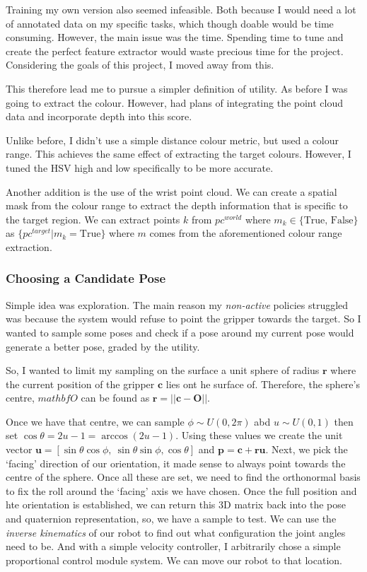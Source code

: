 Training my own version also seemed infeasible. Both because I would need a lot of annotated data on my specific tasks, which though doable would be time consuming. However, the main issue was the time. Spending time to tune and create the perfect feature extractor would waste precious time for the project. Considering the goals of this project, I moved away from this.

This therefore lead me to pursue a simpler definition of utility. As before  I was going to extract the colour. However, had plans of integrating the point cloud data and incorporate depth into this score.

Unlike before, I didn't use a simple distance colour metric, but used a colour range. This achieves the same effect of extracting the target colours. However, I tuned the HSV high and low specifically to be more accurate. 

Another addition is the use of the wrist point cloud. We can create a spatial mask from the colour range to extract the depth information that is specific to the target region. We can extract points $k$ from \( {pc}^{world}\) where \(m_k \in \{ \text{True, False} \}\) as \( \{ {pc}^{target} | m_k = \text{True} \} \) where $m$ comes from the aforementioned colour range extraction.

\subsubsection{Choosing a Candidate Pose}\label{sec:appl-first-choose-pose}
Simple idea was exploration. The main reason my \emph{non-active} policies struggled was because the system would refuse to point the gripper towards the target. So I wanted to sample some poses and check if a pose around my current pose would generate a better pose, graded by the utility.

So, I wanted to limit my sampling on the surface a unit sphere of radius $\mathbf{r}$ where the current position of the gripper $\mathbf{c}$ lies ont he surface of. Therefore, the sphere's centre, $mathbf{O}$ can be found as \(\mathbf{r} = || \mathbf{c} - \mathbf{O} || \).

Once we have that centre, we can sample \(\phi \sim U\left(0, 2\pi\right)\) abd \(u\sim U\left(0, 1\right)\) then set \(\cos \theta = 2u - 1 = \arccos\left(2u - 1\right)\). Using these values we create the unit vector \(\mathbf{u} = \left[ \sin\theta\cos\phi, ~\sin\theta\sin\phi, \cos\theta\right]\) and \(\mathbf{p} = \mathbf{c} + \mathbf{ru}\). Next, we pick the `facing' direction of our orientation, it made sense to always point towards the centre of the sphere. Once all these are set, we need to find the orthonormal basis to fix the roll around the  `facing' axis we have chosen. Once the full position and hte orientation is established, we can return this 3D matrix back into the pose and quaternion representation, so, we have a sample to test. We can use the \emph{inverse kinematics} of our robot to find out what configuration the joint angles need to be. And with a simple velocity controller, I arbitrarily chose a simple proportional control module system. We can move our robot to that location.

